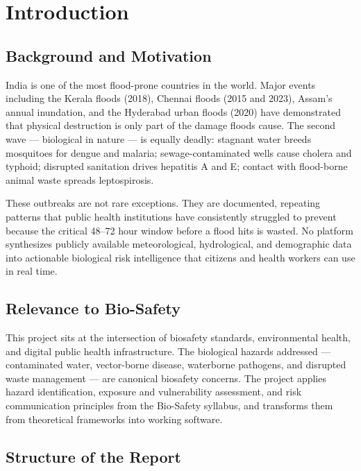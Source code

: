 \documentclass[12pt,a4paper]{report}
\begin{document}
\chapter{Introduction}

\section{Background and Motivation}

India is one of the most flood-prone countries in the world. Major events including the Kerala floods (2018), Chennai floods (2015 and 2023), Assam's annual inundation, and the Hyderabad urban floods (2020) have demonstrated that physical destruction is only part of the damage floods cause. The second wave --- biological in nature --- is equally deadly: stagnant water breeds mosquitoes for dengue and malaria; sewage-contaminated wells cause cholera and typhoid; disrupted sanitation drives hepatitis A and E; contact with flood-borne animal waste spreads leptospirosis.

These outbreaks are not rare exceptions. They are documented, repeating patterns that public health institutions have consistently struggled to prevent because the critical 48--72 hour window before a flood hits is wasted. No platform synthesizes publicly available meteorological, hydrological, and demographic data into actionable biological risk intelligence that citizens and health workers can use in real time.

\section{Relevance to Bio-Safety}

This project sits at the intersection of biosafety standards, environmental health, and digital public health infrastructure. The biological hazards addressed --- contaminated water, vector-borne disease, waterborne pathogens, and disrupted waste management --- are canonical biosafety concerns. The project applies hazard identification, exposure and vulnerability assessment, and risk communication principles from the Bio-Safety syllabus, and transforms them from theoretical frameworks into working software.

\section{Structure of the Report}
\end{document}
